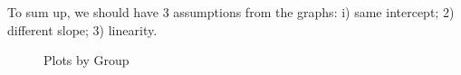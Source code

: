 \documentclass[letterpaper, 12pt]{article}
\begin{document}
To sum up, we should have 3 assumptions from the graphs: i) same intercept; 2) different slope; 3) linearity.
\begin{figure}[htbp]
	\caption{Plots by Group}
	\label{plot1}
	\centering
\end{figure}
\end{document}
